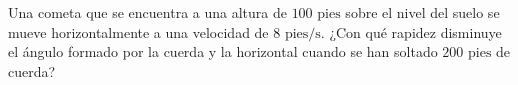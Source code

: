 \item Una cometa que se encuentra a una altura de $100 \text{ pies}$ sobre el nivel del suelo se mueve horizontalmente a una velocidad de $8 \text{ pies/s}$. ¿Con qué rapidez disminuye el ángulo formado por la cuerda y la horizontal cuando se han soltado $200 \text{ pies}$ de cuerda?
